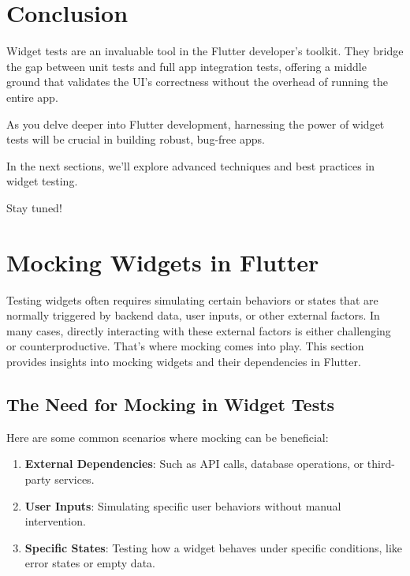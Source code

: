 \documentclass[
]{article}
\providecommand{\tightlist}{%
  \setlength{\itemsep}{0pt}\setlength{\parskip}{0pt}}
\begin{document}
\section{Conclusion}\label{conclusion-4}

Widget tests are an invaluable tool in the Flutter developer's toolkit.
They bridge the gap between unit tests and full app integration tests,
offering a middle ground that validates the UI's correctness without the
overhead of running the entire app.

As you delve deeper into Flutter development, harnessing the power of
widget tests will be crucial in building robust, bug-free apps.

In the next sections, we'll explore advanced techniques and best
practices in widget testing.

Stay tuned!

\section{Mocking Widgets in Flutter}\label{mocking-widgets-in-flutter}

Testing widgets often requires simulating certain behaviors or states
that are normally triggered by backend data, user inputs, or other
external factors. In many cases, directly interacting with these
external factors is either challenging or counterproductive. That's
where mocking comes into play. This section provides insights into
mocking widgets and their dependencies in Flutter.

\subsection{The Need for Mocking in Widget
Tests}\label{the-need-for-mocking-in-widget-tests}

Here are some common scenarios where mocking can be beneficial:

\begin{enumerate}
\def\labelenumi{\arabic{enumi}.}
\tightlist
\item
  \textbf{External Dependencies}: Such as API calls, database
  operations, or third-party services.
\item
  \textbf{User Inputs}: Simulating specific user behaviors without
  manual intervention.
\item
  \textbf{Specific States}: Testing how a widget behaves under specific
  conditions, like error states or empty data.
\end{enumerate}
\end{document}
